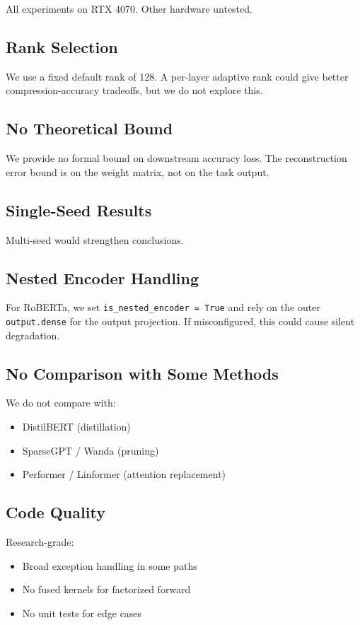 All experiments on RTX 4070. Other hardware untested.

\subsection{Rank Selection}

We use a fixed default rank of 128. A per-layer adaptive rank could give 
better compression-accuracy tradeoffs, but we do not explore this.

\subsection{No Theoretical Bound}

We provide no formal bound on downstream accuracy loss. The reconstruction 
error bound is on the weight matrix, not on the task output.

\subsection{Single-Seed Results}

Multi-seed would strengthen conclusions.

\subsection{Nested Encoder Handling}

For RoBERTa, we set \texttt{is\_nested\_encoder = True} and rely on the outer 
\texttt{output.dense} for the output projection. If misconfigured, this could 
cause silent degradation.

\subsection{No Comparison with Some Methods}

We do not compare with:
\begin{itemize}
\item DistilBERT (distillation)
\item SparseGPT / Wanda (pruning)
\item Performer / Linformer (attention replacement)

\end{itemize}
\subsection{Code Quality}

Research-grade:
\begin{itemize}
\item Broad exception handling in some paths
\item No fused kernels for factorized forward
\item No unit tests for edge cases

\end{itemize}
